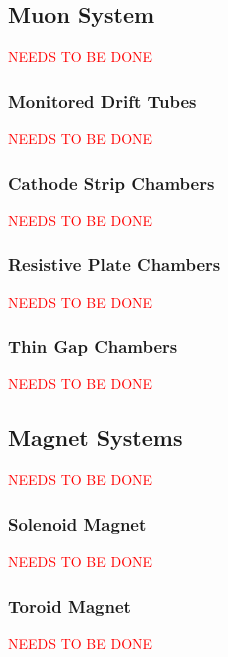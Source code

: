 	\subsection{Muon System}{
		\textcolor{red}{NEEDS TO BE DONE}
	}

		\subsubsection{Monitored Drift Tubes}{
			\textcolor{red}{NEEDS TO BE DONE}
		}

		\subsubsection{Cathode Strip Chambers}{
			\textcolor{red}{NEEDS TO BE DONE}
		}

		\subsubsection{Resistive Plate Chambers}{
			\textcolor{red}{NEEDS TO BE DONE}
		}

		\subsubsection{Thin Gap Chambers}{
			\textcolor{red}{NEEDS TO BE DONE}
		}

	\subsection{Magnet Systems}{
		\textcolor{red}{NEEDS TO BE DONE}
	}

		\subsubsection{Solenoid Magnet}{
			\textcolor{red}{NEEDS TO BE DONE}
		}

		\subsubsection{Toroid Magnet}{
			\textcolor{red}{NEEDS TO BE DONE}
		}

		